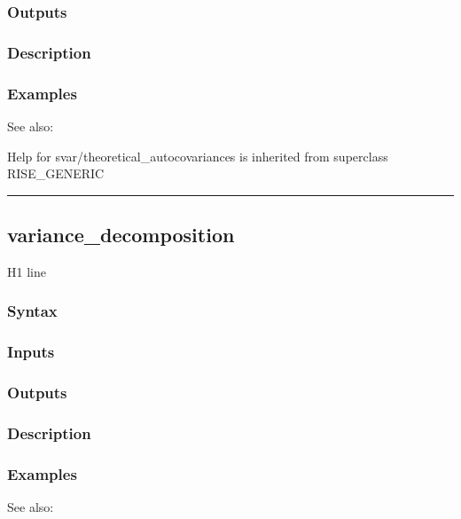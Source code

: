 \documentclass[letterpaper,10pt,english]{sphinxmanual}
\begin{document}
\subsubsection{Outputs}
\label{classes/models/@svar/svar:id146}

\subsubsection{Description}
\label{classes/models/@svar/svar:id147}

\subsubsection{Examples}
\label{classes/models/@svar/svar:id148}
See also:

Help for svar/theoretical\_autocovariances is inherited from superclass RISE\_GENERIC


\bigskip\hrule{}\bigskip



\subsection{variance\_decomposition}
\label{classes/models/@svar/svar:id149}\label{classes/models/@svar/svar:variance-decomposition}
H1 line


\subsubsection{Syntax}
\label{classes/models/@svar/svar:id150}

\subsubsection{Inputs}
\label{classes/models/@svar/svar:id151}

\subsubsection{Outputs}
\label{classes/models/@svar/svar:id152}

\subsubsection{Description}
\label{classes/models/@svar/svar:id153}

\subsubsection{Examples}
\label{classes/models/@svar/svar:id154}
See also:
\end{document}
